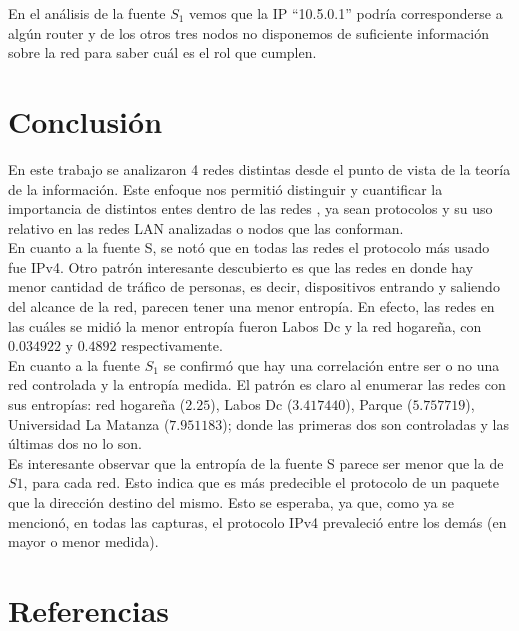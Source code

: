 \documentclass[final,inline,narroweqnarray,a4paper]{ieee}
\begin{document}
En el análisis de la fuente $S_1$ vemos que la IP ``10.5.0.1'' podría corresponderse a algún router y de los otros tres nodos no disponemos de suficiente información sobre la red para saber cuál es el rol que cumplen.

\section{Conclusión}
\par En este trabajo se analizaron 4 redes distintas desde el punto de vista de la teoría de la información. Este enfoque nos permitió distinguir y cuantificar la importancia de distintos entes dentro de las redes , ya sean protocolos y su uso relativo en las redes LAN analizadas o nodos que las conforman. \\ 
 En cuanto a la fuente S, se notó que en todas las redes el protocolo más usado fue IPv4. Otro patrón interesante descubierto es que las redes en donde hay menor cantidad de tráfico de personas, es decir, dispositivos entrando y saliendo del alcance de la red, parecen tener una menor entropía. En efecto, las redes en las cuáles se midió la menor entropía fueron Labos Dc y la red hogareña, con $0.034922$ y $0.4892$ respectivamente. \\ 
 En cuanto a la fuente $S_1$ se confirmó que hay una correlación entre ser o no una red controlada y la entropía medida. El patrón es claro al enumerar las redes con sus entropías: red hogareña ($2.25$), Labos Dc ($3.417440$), Parque ($5.757719$), Universidad La Matanza ($7.951183$); donde las primeras dos son controladas y las últimas dos no lo son. \\
 Es interesante observar que la entropía de la fuente S parece ser menor que la de $S1$, para cada red. Esto indica que es más predecible el protocolo de un paquete que la dirección destino del mismo. Esto se esperaba, ya que, como ya se mencionó, en todas las capturas, el protocolo IPv4 prevaleció entre los demás (en mayor o menor medida).

 

\section{Referencias}
\end{document}
